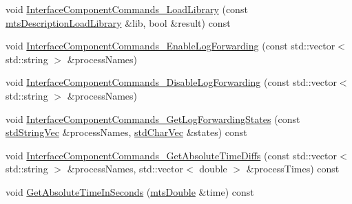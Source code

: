\begin{DoxyCompactItemize}
\item 
void \hyperlink{classmts_manager_component_client_a57f8645c0a6863afe5de2015663ed56e}{Interface\+Component\+Commands\+\_\+\+Load\+Library} (const \hyperlink{classmts_description_load_library}{mts\+Description\+Load\+Library} \&lib, bool \&result) const 
\item 
void \hyperlink{classmts_manager_component_client_a0f18b0ca5e0033d8b79d3c122cabfc34}{Interface\+Component\+Commands\+\_\+\+Enable\+Log\+Forwarding} (const std\+::vector$<$ std\+::string $>$ \&process\+Names)
\item 
void \hyperlink{classmts_manager_component_client_ae1414f75a81804aef52ebb98fd57ffb4}{Interface\+Component\+Commands\+\_\+\+Disable\+Log\+Forwarding} (const std\+::vector$<$ std\+::string $>$ \&process\+Names)
\item 
void \hyperlink{classmts_manager_component_client_ae2718770ec2d7fe575827ef2fe3021d9}{Interface\+Component\+Commands\+\_\+\+Get\+Log\+Forwarding\+States} (const \hyperlink{mts_generic_object_proxy_8h_ae2238149254430b4959aa4e16892fc07}{std\+String\+Vec} \&process\+Names, \hyperlink{mts_generic_object_proxy_8h_a3fcb43cabc338a5aee6772138bee2416}{std\+Char\+Vec} \&states) const 
\item 
void \hyperlink{classmts_manager_component_client_ae7eea9db98c4c4075089dd526f632c02}{Interface\+Component\+Commands\+\_\+\+Get\+Absolute\+Time\+Diffs} (const std\+::vector$<$ std\+::string $>$ \&process\+Names, std\+::vector$<$ double $>$ \&process\+Times) const 
\item 
void \hyperlink{classmts_manager_component_client_a28c83b829432326cc4fe6bcd340a7b17}{Get\+Absolute\+Time\+In\+Seconds} (\hyperlink{mts_generic_object_proxy_8h_a31e76b0190a8d3f9838626cd7b47bd75}{mts\+Double} \&time) const 
\end{DoxyCompactItemize}
